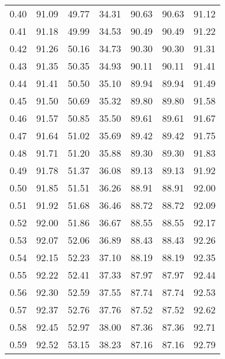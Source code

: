 \begin{tabular}{|c|c|c|c|c|c|c|}
      0.40 &     91.09 &     49.77 &      34.31 &   90.63 &      90.63 &         91.12 \\
      0.41 &     91.18 &     49.99 &      34.53 &   90.49 &      90.49 &         91.22 \\
      0.42 &     91.26 &     50.16 &      34.73 &   90.30 &      90.30 &         91.31 \\
      0.43 &     91.35 &     50.35 &      34.93 &   90.11 &      90.11 &         91.41 \\
      0.44 &     91.41 &     50.50 &      35.10 &   89.94 &      89.94 &         91.49 \\
      0.45 &     91.50 &     50.69 &      35.32 &   89.80 &      89.80 &         91.58 \\
      0.46 &     91.57 &     50.85 &      35.50 &   89.61 &      89.61 &         91.67 \\
      0.47 &     91.64 &     51.02 &      35.69 &   89.42 &      89.42 &         91.75 \\
      0.48 &     91.71 &     51.20 &      35.88 &   89.30 &      89.30 &         91.83 \\
      0.49 &     91.78 &     51.37 &      36.08 &   89.13 &      89.13 &         91.92 \\
      0.50 &     91.85 &     51.51 &      36.26 &   88.91 &      88.91 &         92.00 \\
      0.51 &     91.92 &     51.68 &      36.46 &   88.72 &      88.72 &         92.09 \\
      0.52 &     92.00 &     51.86 &      36.67 &   88.55 &      88.55 &         92.17 \\
      0.53 &     92.07 &     52.06 &      36.89 &   88.43 &      88.43 &         92.26 \\
      0.54 &     92.15 &     52.23 &      37.10 &   88.19 &      88.19 &         92.35 \\
      0.55 &     92.22 &     52.41 &      37.33 &   87.97 &      87.97 &         92.44 \\
      0.56 &     92.30 &     52.59 &      37.55 &   87.74 &      87.74 &         92.53 \\
      0.57 &     92.37 &     52.76 &      37.76 &   87.52 &      87.52 &         92.62 \\
      0.58 &     92.45 &     52.97 &      38.00 &   87.36 &      87.36 &         92.71 \\
      0.59 &     92.52 &     53.15 &      38.23 &   87.16 &      87.16 &         92.79 \\

\end{tabular}
